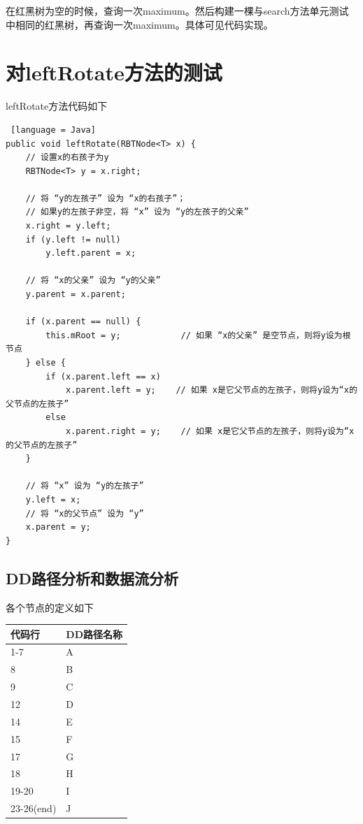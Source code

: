 \documentclass[12pt, a4paper, oneside]{ctexart}
\begin{document}
在红黑树为空的时候，查询一次maximum。然后构建一棵与search方法单元测试中相同的红黑树，再查询一次maximum。具体可见代码实现。

\section{对leftRotate方法的测试}

leftRotate方法代码如下

\begin{lstlisting} [language = Java]
public void leftRotate(RBTNode<T> x) {
    // 设置x的右孩子为y
    RBTNode<T> y = x.right;

    // 将 “y的左孩子” 设为 “x的右孩子”；
    // 如果y的左孩子非空，将 “x” 设为 “y的左孩子的父亲”
    x.right = y.left;
    if (y.left != null)
        y.left.parent = x;

    // 将 “x的父亲” 设为 “y的父亲”
    y.parent = x.parent;

    if (x.parent == null) {
        this.mRoot = y;            // 如果 “x的父亲” 是空节点，则将y设为根节点
    } else {
        if (x.parent.left == x)
            x.parent.left = y;    // 如果 x是它父节点的左孩子，则将y设为“x的父节点的左孩子”
        else
            x.parent.right = y;    // 如果 x是它父节点的左孩子，则将y设为“x的父节点的左孩子”
    }
    
    // 将 “x” 设为 “y的左孩子”
    y.left = x;
    // 将 “x的父节点” 设为 “y”
    x.parent = y;
}
\end{lstlisting}

\subsection{DD路径分析和数据流分析}

各个节点的定义如下

\begin{table}[!h]
    \begin{tabular}{|l|l|}
    \hline
    代码行 & DD路径名称\\ \hline
    1-7 & A\\ \hline
    8 & B\\ \hline
    9 & C \\ \hline
    12 & D \\ \hline
    14 & E \\ \hline
    15 & F \\ \hline
    17 & G \\ \hline
    18 & H \\ \hline
    19-20 & I \\ \hline
    23-26(end) & J \\ \hline
    \end{tabular}
\end{table}
\end{document}
